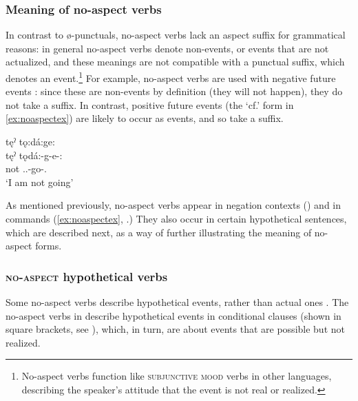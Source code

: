 \subsubsection{Meaning of no-aspect verbs} \label{Meaning of no-aspect verbs}
In contrast to ø-punctuals, no-aspect verbs lack an aspect suffix for grammatical reasons: in general no-aspect verbs denote non-events, or events that are not actualized, and these meanings are not compatible with a punctual suffix, which denotes an event.\footnote{No-aspect verbs function like \textsc{subjunctive mood} verbs in other languages, describing the speaker’s attitude that the event is not real or realized.} For example, no-aspect verbs are used with negative future events : since these are non-events by definition (they will not happen), they do not take a  \textsc{\punctual} suffix. In contrast, positive future events (the ‘cf.’ form in \ref{ex:noaspectex}) are likely to occur as events, and so take a   {\punctual} suffix.

\ea\label{ex:noaspectex} 
tęˀ tǫ:dá:ge:  \\
\gll tęˀ tǫdá:-g-e-:\\
not {\cislocative.\dualic.\indefinite}-go-{\purposive}.{\noaspect}\\
\glt ‘I am not going’
\z


As mentioned previously, no-aspect verbs appear in negation contexts () and in commands (\ref{ex:noaspectex}, .) They also occur in certain hypothetical sentences, which are described next, as a way of further illustrating the meaning of no-aspect forms.



\subsubsection{\textsc{no-aspect} hypothetical verbs} \label{No-aspect hypothetical verbs}
Some no-aspect verbs describe hypothetical events, rather than actual ones . The no-aspect verbs in  describe hypothetical events in conditional clauses (shown in square brackets, see ), which, in turn, are about events that are possible but not realized. 

